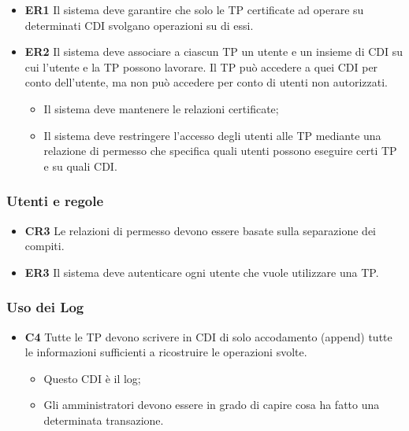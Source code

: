 \begin{itemize}
      \item \textbf{ER1} Il sistema deve garantire che solo le TP certificate ad
            operare su determinati CDI svolgano
            operazioni su di essi.
      \item \textbf{ER2} Il sistema deve associare a ciascun TP un utente e un
            insieme di CDI su cui l'utente e la TP possono lavorare. Il TP può
            accedere a quei CDI per conto dell'utente, ma non può accedere per conto di
            utenti non autorizzati.
            \begin{itemize}
                  \item Il sistema deve mantenere le relazioni certificate;
                  \item Il sistema deve restringere l'accesso degli utenti alle
                        TP mediante una relazione di
                        permesso che specifica quali utenti possono eseguire
                        certi TP e su quali CDI.
            \end{itemize}
\end{itemize}

\subsubsection{Utenti e regole}

\begin{itemize}
      \item \textbf{CR3} Le relazioni di permesso devono essere basate sulla
            separazione dei compiti.
      \item \textbf{ER3} Il sistema deve autenticare ogni utente che vuole
            utilizzare una TP.
\end{itemize}

\subsubsection{Uso dei Log}

\begin{itemize}
      \item \textbf{C4} Tutte le TP devono scrivere in CDI di solo accodamento
            (append) tutte le informazioni
            sufficienti a ricostruire le operazioni svolte.
            \begin{itemize}
                  \item Questo CDI è il log;
                  \item Gli amministratori devono essere in grado di capire
                        cosa ha fatto una determinata
                        transazione.
            \end{itemize}
\end{itemize}

